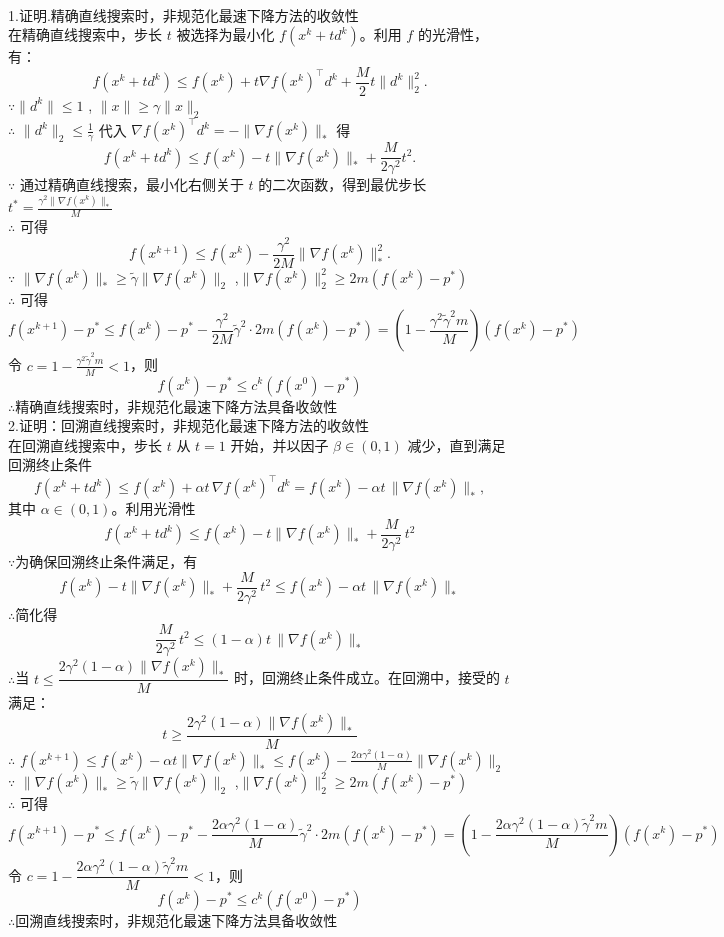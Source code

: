 \documentclass{article}
\newenvironment{solution_cn}{%
  \begin{proof}[解答]%
  \kaishu  %
}{%
  \end{proof}%
}
\begin{document}
\begin{solution_cn}
\quad \\
1.证明.精确直线搜索时，非规范化最速下降方法的收敛性\\
在精确直线搜索中，步长 \( t \) 被选择为最小化 \( f({x}^k + t{d}^k) \)。利用 \( f \) 的光滑性，有：  
$$
f({x}^k + t{d}^k) \leq f({x}^k) + t\nabla f({x}^k)^\top {d}^k + \frac{M}{2} t\|{d}^k\|_2^2.
$$
$\because$\( \|{d}^k\| \leq 1 \) , \( \|{x}\| \geq \gamma\|{x}\|_2 \) \\
$\therefore$ \( \|{d}^k\|_2 \leq \frac{1}{\gamma} \)
代入 \( \nabla f({x}^k)^\top {d}^k = -\|\nabla f({x}^k)\|_* \) 得
$$
f({x}^k + t{d}^k) \leq f({x}^k) - t\|\nabla f({x}^k)\|_* + \frac{M}{2\gamma^2} t^2.
$$  
$\because$ 通过精确直线搜索，最小化右侧关于 \( t \) 的二次函数，得到最优步长 \( t^* = \frac{\gamma^2 \|\nabla f({x}^k)\|_*}{M} \)\\
$\therefore$ 可得
$$
f({x}^{k+1}) \leq f({x}^k) - \frac{\gamma^2}{2M} \|\nabla f({x}^k)\|_*^2.
$$  
$\because$ \( \|\nabla f({x}^k)\|_* \geq \tilde{\gamma} \|\nabla f({x}^k)\|_2 \) ,\(\|\nabla f({x}^k)\|_2^2 \geq 2m(f({x}^k) - p^*) \)\\
$\therefore$ 可得
$$
f({x}^{k+1}) - p^* \leq f({x}^k) - p^* - \frac{\gamma^2}{2M} \tilde{\gamma}^2 \cdot 2m(f({x}^k) - p^*) = \left(1 - \frac{\gamma^2 \tilde{\gamma}^2 m}{M}\right)(f({x}^k) - p^*)
$$  
令 \( c = 1 - \frac{\gamma^2 \tilde{\gamma}^2 m}{M} < 1 \)，则
$$
f({x}^k) - p^* \leq c^k (f({x}^0) - p^*)
$$
$\therefore$精确直线搜索时，非规范化最速下降方法具备收敛性\\
2.证明：回溯直线搜索时，非规范化最速下降方法的收敛性\\
在回溯直线搜索中，步长 \( t \) 从 \( t = 1 \) 开始，并以因子 \( \beta \in (0,1) \) 减少，直到满足回溯终止条件
$$
f({x}^k + t{d}^k) \leq f({x}^k) + \alpha t \, \nabla f({x}^k)^\top {d}^k = f({x}^k) - \alpha t \, \|\nabla f({x}^k)\|_*,
$$  
其中 \( \alpha \in (0,1) \)。利用光滑性 
$$
f({x}^k + t{d}^k) \leq f({x}^k) - t\|\nabla f({x}^k)\|_* + \frac{M}{2\gamma^2} \, t^2
$$
$\because$为确保回溯终止条件满足，有
$$
f({x}^k) - t\|\nabla f({x}^k)\|_* + \frac{M}{2\gamma^2} \, t^2 \leq f({x}^k) - \alpha t \, \|\nabla f({x}^k)\|_*
$$
$\therefore$简化得
$$
\frac{M}{2\gamma^2} \, t^2 \leq (1 - \alpha) t \, \|\nabla f({x}^k)\|_*
$$  
$\therefore$当 \( t \leq \dfrac{2\gamma^2 (1 - \alpha) \|\nabla f({x}^k)\|_*}{M} \) 时，回溯终止条件成立。在回溯中，接受的 \( t \) 满足：  
$$
t \geq \dfrac{2\gamma^2 (1 - \alpha) \|\nabla f({x}^k)\|_*}{M}
$$
$\therefore$
$
f({x}^{k+1}) \leq f({x}^k) - \alpha t \|\nabla f({x}^k)\|_* \leq f({x}^k) - \frac{2\alpha\gamma^2(1 - \alpha)}{M} \|\nabla f({x}^k)\|_2
$ \\
$\because$ \( \|\nabla f({x}^k)\|_* \geq \tilde{\gamma} \|\nabla f({x}^k)\|_2 \) ,\(\|\nabla f({x}^k)\|_2^2 \geq 2m(f({x}^k) - p^*) \)\\
$\therefore$ 可得
$$
f({x}^{k+1}) - p^* \leq f({x}^k) - p^* - \frac{2\alpha\gamma^2(1 - \alpha)}{M} \tilde{\gamma}^2 \cdot 2m(f({x}^k) - p^*) = \left(1 - \frac{2\alpha\gamma^2(1 - \alpha)\tilde{\gamma}^2 m}{M}\right)(f({x}^k) - p^*)
$$  
令 \( c = 1 - \dfrac{2\alpha\gamma^2(1 - \alpha)\tilde{\gamma}^2 m}{M} < 1 \)，则  
$$
f({x}^k) - p^* \leq c^k (f({x}^0) - p^*)
$$  
$\therefore$回溯直线搜索时，非规范化最速下降方法具备收敛性 
\end{solution_cn}
\end{document}
